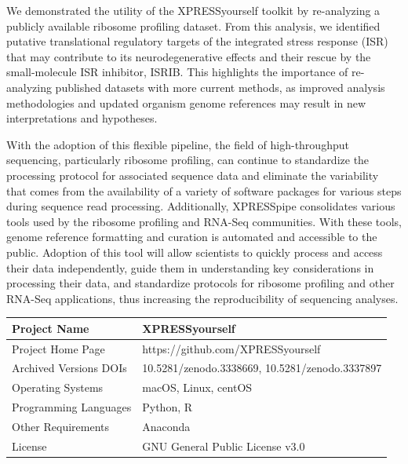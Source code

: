 \documentclass[10pt, oneside]{article}
\begin{document}
We demonstrated the utility of the XPRESSyourself toolkit by re-analyzing a publicly available ribosome profiling dataset. From this analysis, we identified putative translational regulatory targets of the integrated stress response (ISR) that may contribute to its neurodegenerative effects and their rescue by the small-molecule ISR inhibitor, ISRIB. This highlights the importance of re-analyzing published datasets with more current methods, as improved analysis methodologies and updated organism genome references may result in new interpretations and hypotheses. \par

With the adoption of this flexible pipeline, the field of high-throughput sequencing, particularly ribosome profiling, can continue to standardize the processing protocol for associated sequence data and eliminate the variability that comes from the availability of a variety of software packages for various steps during sequence read processing. Additionally, XPRESSpipe consolidates various tools used by the ribosome profiling and RNA-Seq communities. With these tools, genome reference formatting and curation is automated and accessible to the public. Adoption of this tool will allow scientists to quickly process and access their data independently, guide them in understanding key considerations in processing their data, and standardize protocols for ribosome profiling and other RNA-Seq applications, thus increasing the reproducibility of sequencing analyses. \\

\begin{table}[!]
    \centering
{}
\begin{tabular}{p{4cm}p{9cm}}
 Project Name & XPRESSyourself \\
 \hline
 Project Home Page & https://github.com/XPRESSyourself \\
 \hline
 Archived Versions DOIs & 10.5281/zenodo.3338669, 10.5281/zenodo.3337897 \\
 \hline
 Operating Systems & macOS, Linux, centOS \\
 \hline
 Programming Languages & Python, R \\
 \hline
 Other Requirements & Anaconda \\
 \hline
 License & GNU General Public License v3.0 \\
\end{tabular}
\end{table}
\end{document}
